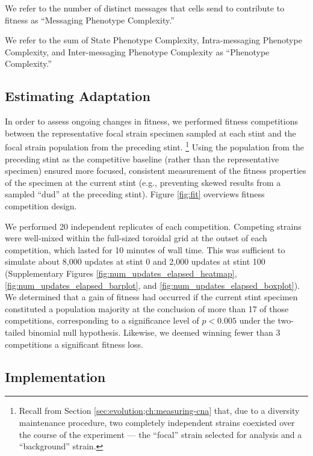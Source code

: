 We refer to the number of distinct messages that cells send to contribute to fitness as ``Messaging Phenotype Complexity.''

We refer to the sum of State Phenotype Complexity, Intra-messaging Phenotype Complexity, and Inter-messaging Phenotype Complexity as ``Phenotype Complexity.''

\subsection{Estimating Adaptation}
\label{sec:measuring-adaptation;ch:measuring-cna}

In order to assess ongoing changes in fitness, we performed fitness competitions between the representative focal strain specimen sampled at each stint and the focal strain population from the preceding stint.%
\footnote{Recall from Section \ref{sec:evolution;ch:measuring-cna} that, due to a diversity maintenance procedure, two completely independent strains coexisted over the course of the experiment --- the ``focal'' strain selected for analysis and a ``background'' strain.}
Using the population from the preceding stint as the competitive baseline (rather than the representative specimen) ensured more focused, consistent measurement of the fitness properties of the specimen at the current stint (e.g., preventing skewed results from a sampled ``dud'' at the preceding stint).
Figure \ref{fig:fit} overviews fitness competition design.




We performed 20 independent replicates of each competition.
Competing strains were well-mixed within the full-sized toroidal grid at the outset of each competition, which lasted for 10 minutes of wall time.
This was sufficient to simulate about 8,000 updates at stint 0 and 2,000 updates at stint 100 (Supplementary Figures \ref{fig:num_updates_elapsed_heatmap}, \ref{fig:num_updates_elapsed_barplot}, and \ref{fig:num_updates_elapsed_boxplot}).
We determined that a gain of fitness had occurred if the current stint specimen constituted a population majority at the conclusion of more than 17 of those competitions, corresponding to a significance level of $p < 0.005$ under the two-tailed binomial null hypothesis.
Likewise, we deemed winning fewer than 3 competitions a significant fitness loss.

\subsection{Implementation}

